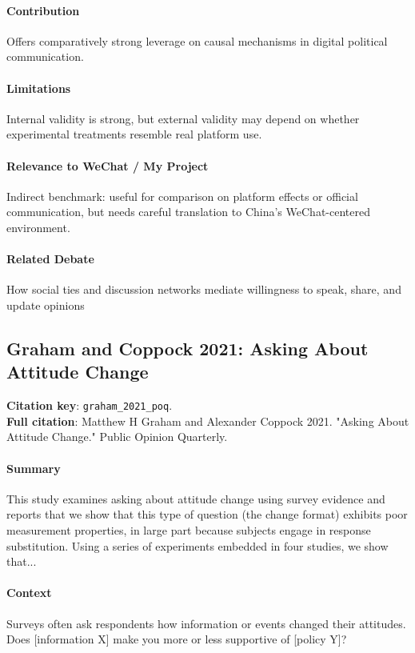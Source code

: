 \documentclass[12pt]{article}
\begin{document}
\paragraph{Contribution} Offers comparatively strong leverage on causal mechanisms in digital political communication.

\paragraph{Limitations} Internal validity is strong, but external validity may depend on whether experimental treatments resemble real platform use.

\paragraph{Relevance to WeChat / My Project} Indirect benchmark: useful for comparison on platform effects or official communication, but needs careful translation to China's WeChat-centered environment.

\paragraph{Related Debate} How social ties and discussion networks mediate willingness to speak, share, and update opinions


\subsection{Graham and Coppock 2021: Asking About Attitude Change}
\textbf{Citation key}: \texttt{graham\_2021\_poq}.\\
\textbf{Full citation}: Matthew H Graham and Alexander Coppock 2021. "Asking About Attitude Change." Public Opinion Quarterly.

\paragraph{Summary} This study examines asking about attitude change using survey evidence and reports that we show that this type of question (the change format) exhibits poor measurement properties, in large part because subjects engage in response substitution. Using a series of experiments embedded in four studies, we show that...

\paragraph{Context} Surveys often ask respondents how information or events changed their attitudes. Does [information X] make you more or less supportive of [policy Y]?
\end{document}
